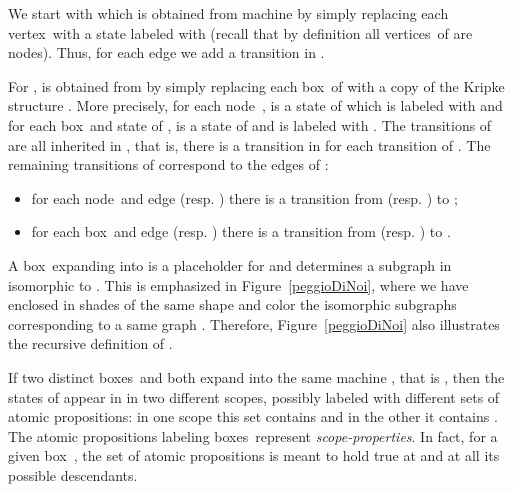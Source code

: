 \documentclass[letterpaper,twocolumn,10pt]{article}
\newcommand{\boxhsm}{box}   \newcommand{\boxes}{boxes}
\newcommand{\nnode}{node} \newcommand{\nnodes}{nodes} \newcommand{\expand} {\mathit{expn}}
\newcommand{\vertex}{\mbox{vertex}}   \newcommand{\vertices}{\mbox{vertices}}
\begin{document}
We start with  which is obtained from machine  by
simply replacing each \vertex\  with a state 
labeled with  (recall that by
definition all \vertices\ of  are \nnodes). Thus, for each
edge  we add a transition  in .

For ,  is obtained from  by simply replacing each
\boxhsm\  of  with a copy of the Kripke structure
. More precisely, for each \nnode\ ,
 is a state of  which is labeled with
 and for each \boxhsm\  and state  of , 
is a state of  and is labeled with . The transitions of
 are all inherited in , that is, there is
a transition  in
 for each  transition  of . The remaining transitions of
 correspond to the edges of :
\begin{itemize}
\item for each \nnode\  and edge 
(resp. ) there
is a transition
from  (resp. ) to ;

\item for each \boxhsm\  and
edge  (resp. ) there
is a transition from  (resp.  )
to .
\end{itemize}

A \boxhsm\  expanding into
 is a placeholder for   and determines
a subgraph in   isomorphic to  .
This is emphasized in Figure~\ref{peggioDiNoi}, where
we have enclosed in shades of the same shape and color the isomorphic
subgraphs corresponding to a same graph .
Therefore, Figure~\ref{peggioDiNoi} also illustrates
the recursive definition of .

If two distinct \boxes\  and  both expand into the same
machine , that is ,
then the states of  appear in  in two different scopes,
possibly labeled with different sets of atomic propositions:
in one scope this set contains  and in the other it
contains .
The atomic propositions labeling \boxes\ represent
\emph{scope-properties}.
In fact, for a given \boxhsm\ , the set  of atomic propositions
is meant to hold true at  and at all its possible descendants.
\end{document}
